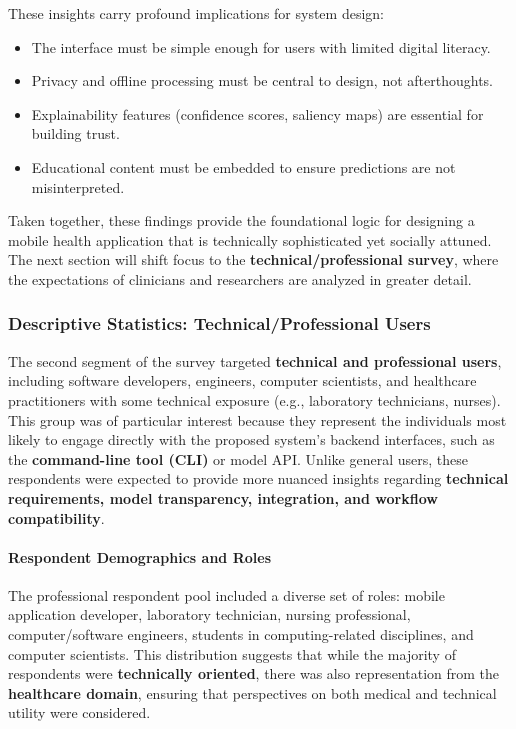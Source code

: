 \documentclass[
  12pt,
  oneside]{article}
\providecommand{\tightlist}{%
  \setlength{\itemsep}{0pt}\setlength{\parskip}{0pt}}
\begin{document}
These insights carry profound implications for system design:

\begin{itemize}
\tightlist
\item
  The interface must be simple enough for users with limited digital
  literacy.\\
\item
  Privacy and offline processing must be central to design, not
  afterthoughts.\\
\item
  Explainability features (confidence scores, saliency maps) are
  essential for building trust.\\
\item
  Educational content must be embedded to ensure predictions are not
  misinterpreted.
\end{itemize}

Taken together, these findings provide the foundational logic for
designing a mobile health application that is technically sophisticated
yet socially attuned. The next section will shift focus to the
\textbf{technical/professional survey}, where the expectations of
clinicians and researchers are analyzed in greater detail.

\subsubsection{Descriptive Statistics: Technical/Professional
Users}\label{descriptive-statistics-technicalprofessional-users}

The second segment of the survey targeted \textbf{technical and
professional users}, including software developers, engineers, computer
scientists, and healthcare practitioners with some technical exposure
(e.g., laboratory technicians, nurses). This group was of particular
interest because they represent the individuals most likely to engage
directly with the proposed system's backend interfaces, such as the
\textbf{command-line tool (CLI)} or model API. Unlike general users,
these respondents were expected to provide more nuanced insights
regarding \textbf{technical requirements, model transparency,
integration, and workflow compatibility}.

\paragraph{Respondent Demographics and
Roles}\label{respondent-demographics-and-roles}

The professional respondent pool included a diverse set of roles: mobile
application developer, laboratory technician, nursing professional,
computer/software engineers, students in computing-related disciplines,
and computer scientists. This distribution suggests that while the
majority of respondents were \textbf{technically oriented}, there was
also representation from the \textbf{healthcare domain}, ensuring that
perspectives on both medical and technical utility were considered.
\end{document}
